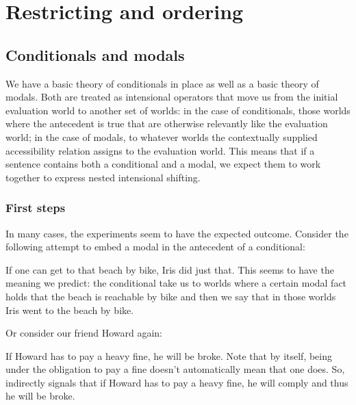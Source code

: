 \chapter{Restricting and ordering}\label{cha:restricting-ordering}

\minitoc

\section{Conditionals and modals}
\label{sec:conditionals-modals}

%
We have a basic theory of conditionals in place as well as a basic theory of
modals. Both are treated as intensional operators that move us from the initial
evaluation world to another set of worlds: in the case of conditionals, those
worlds where the antecedent is true that are otherwise relevantly like the
evaluation world; in the case of modals, to whatever worlds the contextually
supplied accessibility relation assigns to the evaluation world. This means that
if a sentence contains both a conditional and a modal, we expect them to work
together to express nested intensional shifting.

\subsection{First steps}

In many cases, the experiments seem to have the expected outcome. Consider the
following attempt to embed a modal in the antecedent of a conditional:

\ex
If one can get to that beach by bike, Iris did just that.
\xe
%
This seems to have the meaning we predict: the conditional take us to worlds
where a certain modal fact holds \dash that the beach is reachable by bike \dash
and then we say that in those worlds Iris went to the beach by bike.

\kwn Or consider our friend Howard again:

\ex If Howard has to pay a heavy fine, he will be broke. \xe
%
%
Note that by itself, being under the obligation to pay a fine doesn't
automatically mean that one does. So, \Last indirectly signals that if Howard
has to pay a heavy fine, he will comply and thus he will be broke.

